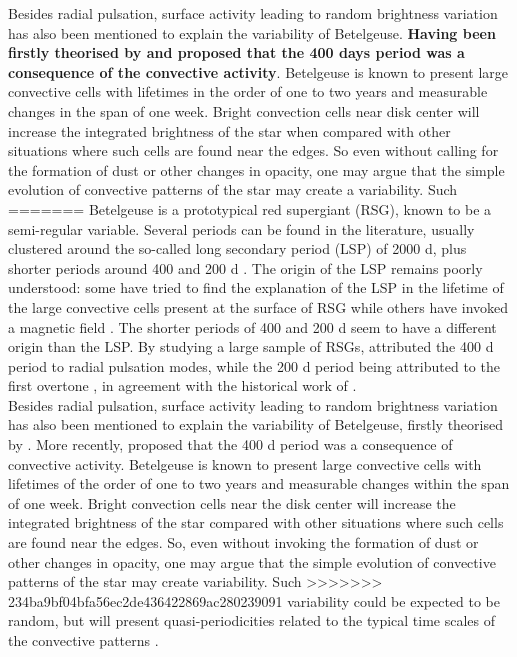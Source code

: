 \documentclass{aa}
\begin{document}
Besides radial pulsation, surface activity leading to random brightness variation has also been mentioned to explain the variability of Betelgeuse. 
\textbf{Having been firstly theorised by \cite{schwarzschild_scale_1975} and \cite{gray_mass_2008} 
proposed that the 400 days period was a consequence of the convective activity}. Betelgeuse is known to present large convective cells with lifetimes in the order of one to two years \citep{lopez_ariste_convective_2018} and measurable changes 
in the span of one week. Bright convection cells near disk center will increase the integrated brightness of the star when 
compared with other situations where such cells are found near the edges. So even without calling for the formation of 
dust or other changes in opacity, one may argue that the simple evolution of convective patterns of the star may create a variability. Such 
=======
Betelgeuse is a prototypical red supergiant (RSG), known to be a semi-regular variable. Several periods can be found in the 
literature, usually clustered around the so-called long secondary period (LSP) of 2000 d, plus shorter periods around 400 and 200 d \citep{kiss_variability_2006}. The origin of the LSP remains poorly understood: some have tried to find the explanation of the LSP in the lifetime of the large convective cells present at the surface of RSG \citep[e.g][]{stothers_giant_2010} while others have invoked a magnetic field \citep{wood_long_2004}. The shorter periods of 400 and 200 d seem to have a different origin than the LSP. By studying a large sample of RSGs, \cite{kiss_variability_2006} attributed the 400 d period to radial pulsation modes, while the 200 d period being attributed to the first overtone \citep{joyce_standing_2020}, in agreement with the historical work of \cite{stothers_pulsation_1969}.\\

Besides radial pulsation, surface activity leading to random brightness variation has also been mentioned to explain the variability of Betelgeuse, firstly theorised by \cite{schwarzschild_scale_1975}. More recently, \cite{gray_mass_2008} proposed that the 400 d period was a consequence of convective activity. Betelgeuse is known to present large convective cells with lifetimes of the order of one to two years \citep{lopez_ariste_convective_2018} and measurable changes 
within the span of one week. Bright convection cells near the disk center will increase the integrated brightness of the star compared with other situations where such cells are found near the edges. So, even without invoking the formation of 
dust or other changes in opacity, one may argue that the simple evolution of convective patterns of the star may create variability. Such 
>>>>>>> 234ba9bf04bfa56ec2de436422869ac280239091
variability could be expected to be random, but will present quasi-periodicities related to the typical time scales of the 
convective patterns \citep{gray_mass_2008}. \\
\end{document}
